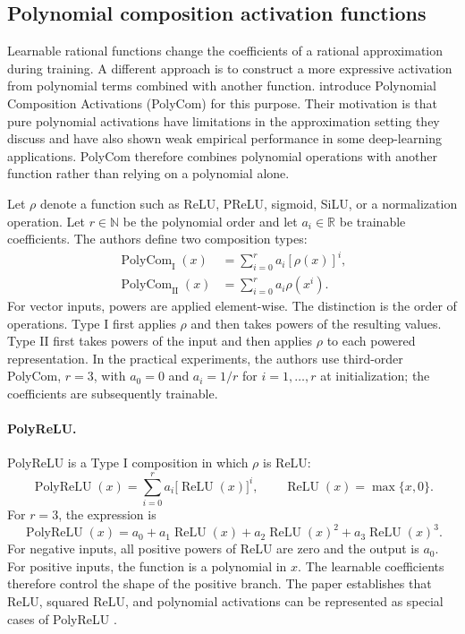 \subsection{Polynomial composition activation functions}
\label{subsec:act-polycom}

Learnable rational functions change the coefficients of a rational
approximation during training. A different approach is to construct a
more expressive activation from polynomial terms combined with another
function. \textcite{zhuo2025polycom} introduce Polynomial Composition
Activations (PolyCom) for this purpose. Their motivation is that pure
polynomial activations have limitations in the approximation setting
they discuss and have also shown weak empirical performance in some
deep-learning applications. PolyCom therefore combines polynomial
operations with another function rather than relying on a polynomial
alone.

Let \(\rho\) denote a function such as ReLU, PReLU, sigmoid, SiLU, or
a normalization operation. Let \(r\in\mathbb{N}\) be the polynomial
order and let \(a_i\in\mathbb{R}\) be trainable coefficients. The
authors define two composition types:
\begin{align}
    \operatorname{PolyCom}_{\mathrm{I}}(x)
    &=
    \sum_{i=0}^{r}a_i[\rho(x)]^i,
    \label{eq:act-polycom-type-one}\\
    \operatorname{PolyCom}_{\mathrm{II}}(x)
    &=
    \sum_{i=0}^{r}a_i\rho(x^i).
    \label{eq:act-polycom-type-two}
\end{align}
For vector inputs, powers are applied element-wise. The distinction is
the order of operations. Type I first applies \(\rho\) and then takes
powers of the resulting values. Type II first takes powers of the input
and then applies \(\rho\) to each powered representation. In the
practical experiments, the authors use third-order PolyCom, \(r=3\),
with \(a_0=0\) and \(a_i=1/r\) for \(i=1,\ldots,r\) at initialization;
the coefficients are subsequently trainable.

\paragraph{PolyReLU.}
PolyReLU is a Type I composition in which \(\rho\) is ReLU:
\begin{equation}
    \operatorname{PolyReLU}(x)
    =
    \sum_{i=0}^{r}a_i
    \bigl[\operatorname{ReLU}(x)\bigr]^i,
    \qquad
    \operatorname{ReLU}(x)=\max\{x,0\}.
    \label{eq:act-polyrelu}
\end{equation}
For \(r=3\), the expression is
\begin{equation}
    \operatorname{PolyReLU}(x)
    =
    a_0+a_1\operatorname{ReLU}(x)
    +a_2\operatorname{ReLU}(x)^2
    +a_3\operatorname{ReLU}(x)^3.
    \label{eq:act-polyrelu-cubic}
\end{equation}
For negative inputs, all positive powers of ReLU are zero and the
output is \(a_0\). For positive inputs, the function is a polynomial
in \(x\). The learnable coefficients therefore control the shape of
the positive branch. The paper establishes that ReLU, squared ReLU,
and polynomial activations can be represented as special cases of
PolyReLU \parencite{zhuo2025polycom}.

